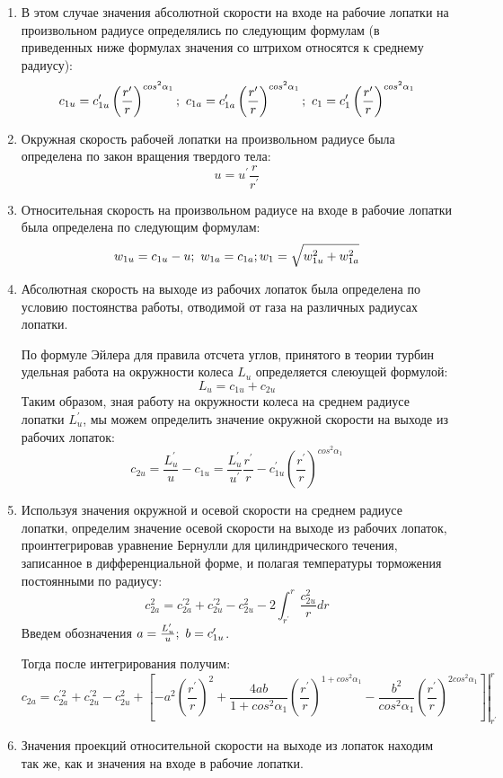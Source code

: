 \documentclass[a4paper,10pt]{article}
\begin{document}
\begin{enumerate}

\item В этом случае значения абсолютной скорости на входе на рабочие лопатки на произвольном радиусе определялись по следующим формулам (в приведенных ниже формулах значения со штрихом относятся к среднему радиусу):
$$c_{1u} = c_{1u}^\prime \left( \frac{r^\prime}{r} \right)^{cos^2\alpha_1}; \/\
c_{1a} = c_{1a}^\prime \left( \frac{r^\prime}{r} \right)^{cos^2\alpha_1}; \/\
c_1 = c_1^\prime \left( \frac{r^\prime}{r} \right)^{cos^2\alpha_1}$$

\item Окружная скорость рабочей лопатки на произвольном радиусе была определена по закон вращения твердого тела:
$$u = u^\prime \frac{r}{r^\prime}$$

\item Относительная скорость на произвольном радиусе на входе в рабочие лопатки была определена по следующим формулам:
$$w_{1u} = c_{1u} - u; \/\ w_{1a} = c_{1a}; w_1 = \sqrt{w_{1u}^2 + w_{1a}^2}$$

\item Абсолютная скорость на выходе из рабочих лопаток была определена по условию постоянства работы, отводимой от газа на различных радиусах лопатки. 

По формуле Эйлера для правила отсчета углов, принятого в теории турбин удельная работа на окружности колеса $L_u$ определяется слеюущей формулой:
$$L_u = c_{1u} + c_{2u}$$
Таким образом, зная работу на окружности колеса на среднем радиусе лопатки $L_u^\prime$, мы можем определить значение окружной скорости на выходе из рабочих лопаток:
$$c_{2u} = \frac{L_u^\prime}{u} - c_{1u} = 
\frac{L_u^\prime}{u^\prime} \frac{r^\prime}{r} - c_{1u}^\prime \left( \frac{r^\prime}{r} \right)^{cos^2\alpha_1} $$

\item Используя значения окружной и осевой скорости на среднем радиусе лопатки, определим значение осевой скорости на выходе из рабочих лопаток, проинтегрировав уравнение Бернулли для цилиндрического течения, записанное в дифференциальной форме, и полагая температуры торможения постоянными по радиусу:
$$c_{2a}^2 = c_{2a}^{\prime 2} + c_{2u}^{\prime 2} - c_{2u}^{2} - 2 \int_{r^\prime}^r \frac{c_{2u}^2}{r} dr$$
Введем обозначения $a = \frac{L_u^\prime}{u}; \/\ b = c_{1u}^\prime$.

Тогда после интегрирования получим:
$$c_{2a} = c_{2a}^{\prime 2} + c_{2u}^{\prime 2} - c_{2u}^{2} + 
\left. \left[ 
	- a^2 \left( \frac{r^\prime}{r} \right)^{2} + 
	\frac{4ab}{1 + cos^2 \alpha_1}\left( \frac{r^\prime}{r} \right)^{1 + 	cos^2\alpha_1} - 
	\frac{b^2}{cos^2 \alpha_1} \left( \frac{r^\prime}{r} \right)^{2cos^2 	\alpha_1}
\right] \right|_{r^\prime}^r$$

\item Значения проекций относительной скорости на выходе из лопаток находим так же, как и значения на входе в рабочие лопатки.

\end{enumerate}
\end{document}
